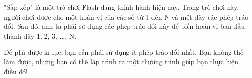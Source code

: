 "Sắp xếp" là một trò chơi Flash đang thịnh hành hiện nay. Trong trò chơi này, người chơi được cho một hoán vị của các số từ 1 đén N và một dãy các phép tráo đổi. Sau đó, anh ta phải sử dụng các phép tráo đổi này để biến hoán vị ban đầu thành dãy 1, 2, 3, ..., N.  

   Để phá được kỉ lục, bạn cần phải sử dụng ít phép tráo đổi nhất. Bạn không thể làm được, nhưng bạn có thể lập trình ra một chương trình giúp bạn thực hiện điều đó!  

\